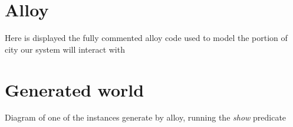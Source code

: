 \section{Alloy}

Here is displayed the fully commented alloy code used to model the portion of city
our system will interact with



\section{Generated world}

Diagram of one of the instances generate by alloy, running the \textit{show} predicate

